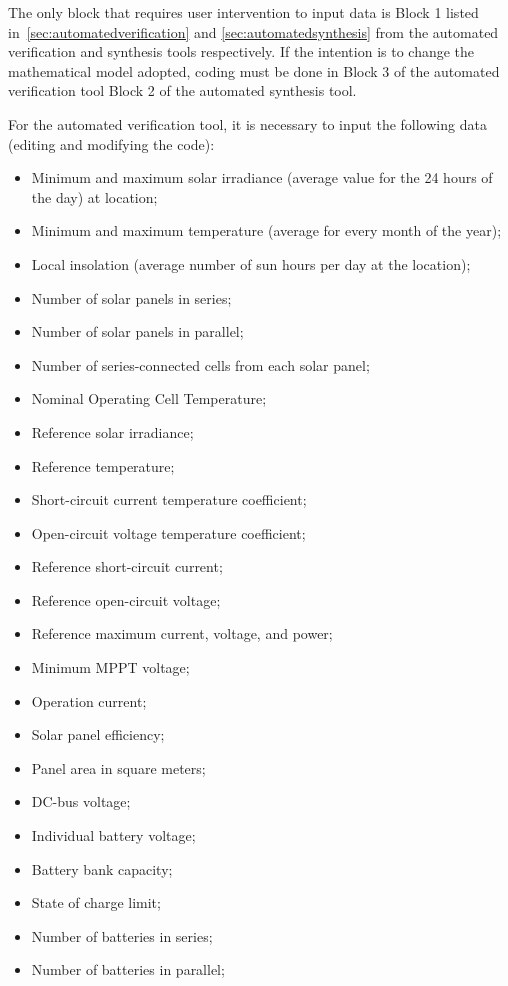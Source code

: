 The only block that requires user intervention to input data is Block 1 listed in~\ref{sec:automatedverification} and \ref{sec:automatedsynthesis} from the automated verification and synthesis tools respectively. If the intention is to change the mathematical model adopted, coding must be done in Block 3 of the automated verification tool Block 2 of the automated synthesis tool.

For the automated verification tool, it is necessary to input the following data (editing and modifying the code):

\begin{itemize}
\item Minimum and maximum solar irradiance (average value for the 24 hours of the day) at location;
\item Minimum and maximum temperature (average for every month of the year);
\item Local insolation (average number of sun hours per day at the location);
\item Number of solar panels in series;
\item Number of solar panels in parallel;
\item Number of series-connected cells from each solar panel;
\item Nominal Operating Cell Temperature;
\item Reference solar irradiance;
\item Reference temperature;
\item Short-circuit current temperature coefficient;
\item Open-circuit voltage temperature coefficient;
\item Reference short-circuit current;
\item Reference open-circuit voltage;
\item Reference maximum current, voltage, and power;
\item Minimum MPPT voltage;
\item Operation current;
\item Solar panel efficiency;
\item Panel area in square meters;
\item DC-bus voltage;
\item Individual battery voltage;
\item Battery bank capacity;
\item State of charge limit;
\item Number of batteries in series;
\item Number of batteries in parallel;

\end{itemize}
